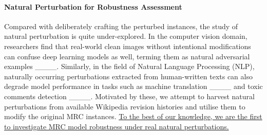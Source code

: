 \paragraph{Natural Perturbation for Robustness Assessment} Compared with deliberately crafting the perturbed instances, the study of natural perturbation is quite under-explored. In the computer vision domain, researchers find that real-world clean images without intentional modifications can confuse deep learning models as well, terming them as natural adversarial examples ____. Similarly, in the field of Natural Language Processing (NLP), naturally occurring perturbations extracted from human-written texts can also degrade model performance in tasks such as machine translation ____ and toxic comments detection ____.
Motivated by these, we attempt to harvest natural perturbations from available Wikipedia revision histories and utilise them to modify the original MRC instances.
\uline{To the best of our knowledge, we are the first to investigate MRC model robustness under real natural perturbations.}
